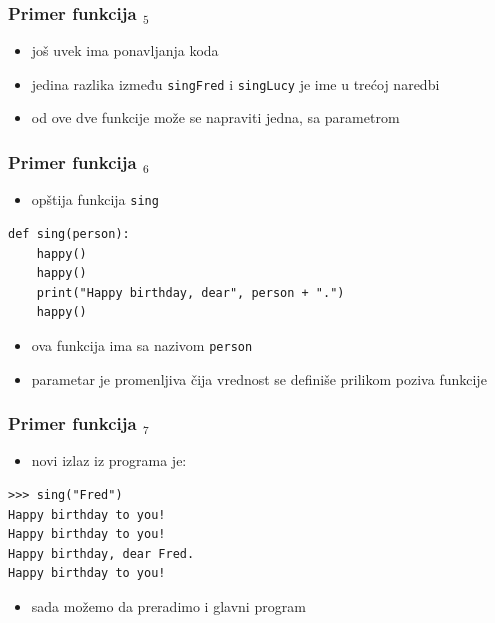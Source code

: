 \documentclass[compress]{beamer}
\begin{document}
\begin{frame}[fragile]
  \frametitle{Primer funkcija $_5$}
  \begin{itemize}
    \item još uvek ima ponavljanja koda
    \item jedina razlika između \texttt{singFred} i \texttt{singLucy} je ime u trećoj naredbi
    \item od ove dve funkcije može se napraviti jedna, sa parametrom
  \end{itemize}
\end{frame}

\begin{frame}[fragile]
  \frametitle{Primer funkcija $_6$}
  \begin{itemize}
    \item opštija funkcija \texttt{sing} 
  \end{itemize}
\begin{verbatim}
def sing(person):
    happy()
    happy()
    print("Happy birthday, dear", person + ".")
    happy()
\end{verbatim}
  \begin{itemize}
    \item ova funkcija ima  sa nazivom \texttt{person}
    \item parametar je promenljiva čija vrednost se definiše prilikom poziva funkcije
  \end{itemize}
\end{frame}

\begin{frame}[fragile]
  \frametitle{Primer funkcija $_7$}
  \begin{itemize}
    \item novi izlaz iz programa je:
  \end{itemize}
\begin{verbatim}
>>> sing("Fred")
Happy birthday to you!
Happy birthday to you!
Happy birthday, dear Fred.
Happy birthday to you!
\end{verbatim}
  \begin{itemize}
    \item sada možemo da preradimo i glavni program
  \end{itemize}
\end{frame}
\end{document}
